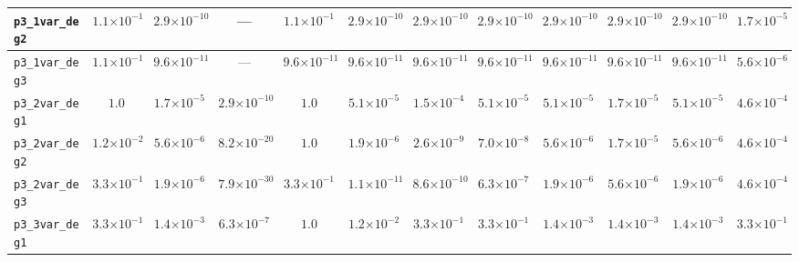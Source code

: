 \begin{landscape}
\begin{table}[H]
{\begin{tabular}{lccccccccccc}
\hline
\texttt{p3\_1var\_deg2} & $1.1{\scriptstyle\times 10^{-1}}$ & \textbf{$2.9{\scriptstyle\times 10^{-10}}$} & --- & $1.1{\scriptstyle\times 10^{-1}}$ & \textbf{$2.9{\scriptstyle\times 10^{-10}}$} & \textbf{$2.9{\scriptstyle\times 10^{-10}}$} & \textbf{$2.9{\scriptstyle\times 10^{-10}}$} & \textbf{$2.9{\scriptstyle\times 10^{-10}}$} & \textbf{$2.9{\scriptstyle\times 10^{-10}}$} & \textbf{$2.9{\scriptstyle\times 10^{-10}}$} & $1.7{\scriptstyle\times 10^{-5}}$ \\
\hline
\texttt{p3\_1var\_deg3} & $1.1{\scriptstyle\times 10^{-1}}$ & \textbf{$9.6{\scriptstyle\times 10^{-11}}$} & --- & \textbf{$9.6{\scriptstyle\times 10^{-11}}$} & \textbf{$9.6{\scriptstyle\times 10^{-11}}$} & \textbf{$9.6{\scriptstyle\times 10^{-11}}$} & \textbf{$9.6{\scriptstyle\times 10^{-11}}$} & \textbf{$9.6{\scriptstyle\times 10^{-11}}$} & \textbf{$9.6{\scriptstyle\times 10^{-11}}$} & \textbf{$9.6{\scriptstyle\times 10^{-11}}$} & $5.6{\scriptstyle\times 10^{-6}}$ \\
\hline
\texttt{p3\_2var\_deg1} & $1.0$ & $1.7{\scriptstyle\times 10^{-5}}$ & \textbf{$2.9{\scriptstyle\times 10^{-10}}$} & $1.0$ & $5.1{\scriptstyle\times 10^{-5}}$ & $1.5{\scriptstyle\times 10^{-4}}$ & $5.1{\scriptstyle\times 10^{-5}}$ & $5.1{\scriptstyle\times 10^{-5}}$ & $1.7{\scriptstyle\times 10^{-5}}$ & $5.1{\scriptstyle\times 10^{-5}}$ & $4.6{\scriptstyle\times 10^{-4}}$ \\
\hline
\texttt{p3\_2var\_deg2} & $1.2{\scriptstyle\times 10^{-2}}$ & $5.6{\scriptstyle\times 10^{-6}}$ & \textbf{$8.2{\scriptstyle\times 10^{-20}}$} & $1.0$ & $1.9{\scriptstyle\times 10^{-6}}$ & $2.6{\scriptstyle\times 10^{-9}}$ & $7.0{\scriptstyle\times 10^{-8}}$ & $5.6{\scriptstyle\times 10^{-6}}$ & $1.7{\scriptstyle\times 10^{-5}}$ & $5.6{\scriptstyle\times 10^{-6}}$ & $4.6{\scriptstyle\times 10^{-4}}$ \\
\hline
\texttt{p3\_2var\_deg3} & $3.3{\scriptstyle\times 10^{-1}}$ & $1.9{\scriptstyle\times 10^{-6}}$ & \textbf{$7.9{\scriptstyle\times 10^{-30}}$} & $3.3{\scriptstyle\times 10^{-1}}$ & $1.1{\scriptstyle\times 10^{-11}}$ & $8.6{\scriptstyle\times 10^{-10}}$ & $6.3{\scriptstyle\times 10^{-7}}$ & $1.9{\scriptstyle\times 10^{-6}}$ & $5.6{\scriptstyle\times 10^{-6}}$ & $1.9{\scriptstyle\times 10^{-6}}$ & $4.6{\scriptstyle\times 10^{-4}}$ \\
\hline
\texttt{p3\_3var\_deg1} & $3.3{\scriptstyle\times 10^{-1}}$ & $1.4{\scriptstyle\times 10^{-3}}$ & \textbf{$6.3{\scriptstyle\times 10^{-7}}$} & $1.0$ & $1.2{\scriptstyle\times 10^{-2}}$ & $3.3{\scriptstyle\times 10^{-1}}$ & $3.3{\scriptstyle\times 10^{-1}}$ & $1.4{\scriptstyle\times 10^{-3}}$ & $1.4{\scriptstyle\times 10^{-3}}$ & $1.4{\scriptstyle\times 10^{-3}}$ & $3.3{\scriptstyle\times 10^{-1}}$ \\

\end{tabular}}
\end{table}
\end{landscape}
